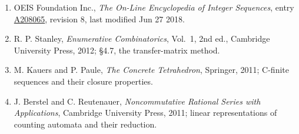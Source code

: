 \documentclass[11pt]{article}
\theoremstyle{definition}
\begin{document}
\begin{enumerate}

\item OEIS Foundation Inc., \emph{The On-Line Encyclopedia of Integer Sequences}, entry \href{https://oeis.org/A208065}{A208065}, revision 8, last modified Jun 27 2018.

\item R. P. Stanley, \emph{Enumerative Combinatorics}, Vol.~1, 2nd ed., Cambridge University Press, 2012; \S4.7, the transfer-matrix method.

\item M. Kauers and P. Paule, \emph{The Concrete Tetrahedron}, Springer, 2011; C-finite sequences and their closure properties.

\item J. Berstel and C. Reutenauer, \emph{Noncommutative Rational Series with Applications}, Cambridge University Press, 2011; linear representations of counting automata and their reduction.

\end{enumerate}
\end{document}
